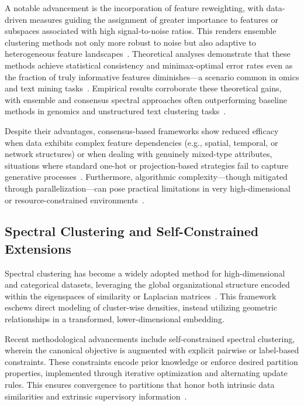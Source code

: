 \documentclass[sigconf]{acmart}
\begin{document}
A notable advancement is the incorporation of feature reweighting, with data-driven measures guiding the assignment of greater importance to features or subspaces associated with high signal-to-noise ratios. This renders ensemble clustering methods not only more robust to noise but also adaptive to heterogeneous feature landscapes~\cite{ref99,ref116}. Theoretical analyses demonstrate that these methods achieve statistical consistency and minimax-optimal error rates even as the fraction of truly informative features diminishes—a scenario common in omics and text mining tasks~\cite{ref96,ref116}. Empirical results corroborate these theoretical gains, with ensemble and consensus spectral approaches often outperforming baseline methods in genomics and unstructured text clustering tasks~\cite{ref116}.

Despite their advantages, consensus-based frameworks show reduced efficacy when data exhibits complex feature dependencies (e.g., spatial, temporal, or network structures) or when dealing with genuinely mixed-type attributes, situations where standard one-hot or projection-based strategies fail to capture generative processes~\cite{ref116}. Furthermore, algorithmic complexity—though mitigated through parallelization—can pose practical limitations in very high-dimensional or resource-constrained environments~\cite{ref116}.

\subsection{Spectral Clustering and Self-Constrained Extensions}

Spectral clustering has become a widely adopted method for high-dimensional and categorical datasets, leveraging the global organizational structure encoded within the eigenspaces of similarity or Laplacian matrices~\cite{ref36,ref117}. This framework eschews direct modeling of cluster-wise densities, instead utilizing geometric relationships in a transformed, lower-dimensional embedding.

Recent methodological advancements include self-constrained spectral clustering, wherein the canonical objective is augmented with explicit pairwise or label-based constraints. These constraints encode prior knowledge or enforce desired partition properties, implemented through iterative optimization and alternating update rules. This ensures convergence to partitions that honor both intrinsic data similarities and extrinsic supervisory information~\cite{ref117}.
\end{document}
